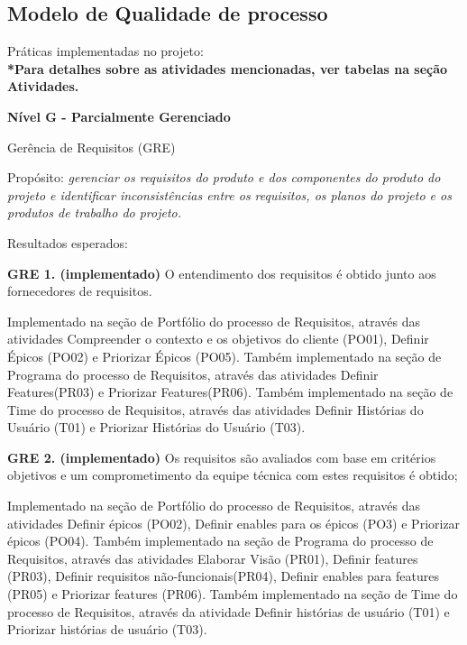{\large {\subsection { Modelo de Qualidade de processo \\ } } }
{\large Práticas implementadas no projeto:\\}
{\footnotesize {\textbf { *Para detalhes sobre as atividades mencionadas, ver tabelas na seção Atividades. \\ }}}

\begin {enumerate}
{\item {\large \textbf{Nível G - Parcialmente Gerenciado \\}}}

\begin  {itemize}
{{\item {Gerência de Requisitos (GRE)}}}

{\tab Propósito: \textit{gerenciar os requisitos do produto e dos componentes do produto do projeto e identificar inconsistências entre os requisitos, os planos do projeto e os produtos de trabalho do projeto.\\}}

{Resultados esperados:\\}

\begin {itemize}

{\item \textbf{GRE 1. (implementado)} O entendimento dos requisitos é obtido junto aos fornecedores de requisitos.}

Implementado na seção de Portfólio do processo de Requisitos, através das atividades Compreender o contexto e os objetivos do cliente (PO01), Definir Épicos (PO02) e Priorizar Épicos (PO05).
Também implementado na seção de Programa do processo de Requisitos, através das atividades Definir Features(PR03) e Priorizar Features(PR06).
Também implementado na seção de Time do processo de Requisitos, através das atividades Definir Histórias do Usuário (T01) e Priorizar Histórias do Usuário (T03).


{\item \textbf{GRE 2. (implementado)} Os requisitos são avaliados com base em critérios objetivos e um comprometimento da equipe técnica com estes requisitos é obtido;}

Implementado na seção de Portfólio do processo de Requisitos, através das atividades Definir épicos (PO02), Definir enables para os épicos (PO3) e Priorizar épicos (PO04).
Também implementado na seção de Programa do processo de Requisitos, através das atividades Elaborar Visão (PR01), Definir features (PR03), Definir requisitos não-funcionais(PR04), Definir enables para features (PR05) e Priorizar features (PR06).
Também implementado na seção de Time do processo de Requisitos, através da atividade Definir histórias de usuário (T01) e Priorizar histórias de usuário (T03).


\end{itemize}
\end{itemize}
\end{enumerate}
